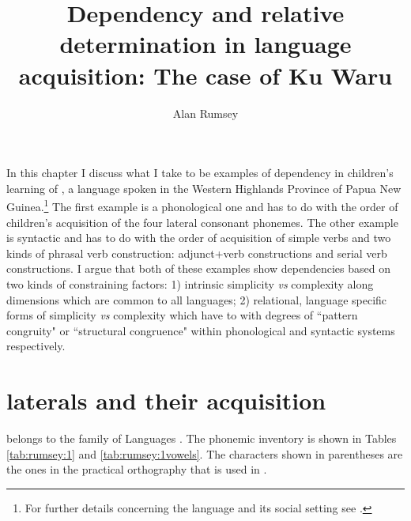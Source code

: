 \documentclass[output=paper]{langsci/langscibook}
\title{Dependency and relative determination in language acquisition: The case of {Ku Waru}}
\author{Alan Rumsey\affiliation{Australian National University}
}
\begin{document}
\maketitle

    
\noindent In this chapter I discuss what I take to be examples of dependency in children’s learning of , a  language spoken in the Western Highlands Prov\-ince of Papua New Guinea.\footnote{For further details concerning the  language and its social setting see \citet{Merlan1991}.} The first example is a phonological one and has to do with the order of children’s acquisition of the four  lateral consonant phonemes. The other example is syntactic and has to do with the order of acquisition of simple verbs and two kinds of phrasal verb construction: adjunct+verb constructions and serial verb constructions. I argue that both of these examples show dependencies based on two kinds of constraining factors: 1) intrinsic simplicity \textit{vs} complexity along dimensions which are common to all languages; 2) relational, language specific forms of simplicity \textit{vs} complexity which have to with degrees of ``pattern congruity" or ``structural congruence" within phonological and syntactic systems respectively.   

\section{ laterals and their acquisition}

 belongs to the  family of  Languages \citep{Pawley2009}. The  phonemic inventory is shown in Tables \ref{tab:rumsey:1} and \ref{tab:rumsey:1vowels}.  The characters shown in parentheses are the ones in the practical orthography that is used in .
\end{document}
